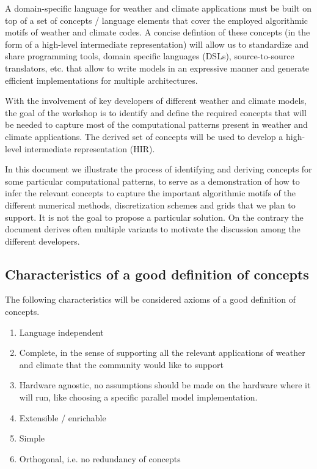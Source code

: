 \documentclass[a4paper,10pt]{scrartcl}
\begin{document}
A domain-specific language for weather and climate applications must be built on top
of a set of concepts / language elements
that cover the employed algorithmic motifs of weather and climate codes.
A concise defintion of these concepts (in the form of a high-level intermediate representation)
will allow us to standardize and share programming tools, domain specific languages (DSLs),
source-to-source translators, etc. that allow to write
models in an expressive manner and generate efficient implementations
for multiple architectures.

With the involvement of key developers of different weather and climate
models, the goal of the workshop is to identify and define the required concepts
that will be needed to capture most of the computational
patterns present in weather and climate applications. The derived set of concepts will be used
to develop a high-level intermediate representation (HIR).

In this document we illustrate the process of identifying and deriving concepts 
for some particular computational patterns, to 
serve as a demonstration of how to infer the relevant concepts
to capture the important algorithmic motifs of the different numerical methods,
discretization schemes and grids that we plan to support.
It is not the goal to propose a particular solution. On the contrary the document
derives often multiple variants to motivate the discussion among the different developers.

\subsection{Characteristics of a good definition of concepts}

The following characteristics will be considered axioms of a good definition of concepts.
\label{sec:HIRDef}
\begin{enumerate}[label=\textbf{A.\arabic*}]
    \item Language independent 
    \item Complete, in the sense of supporting all the relevant applications of weather and climate that the community would like to support
    \item Hardware agnostic, no assumptions should be made on the hardware where it will run, like choosing a specific parallel model implementation. \label{A:hardware}
    \item Extensible / enrichable
    \item Simple
    \item Orthogonal, i.e. no redundancy of concepts \label{A:ortho}
\end{enumerate}
\end{document}
